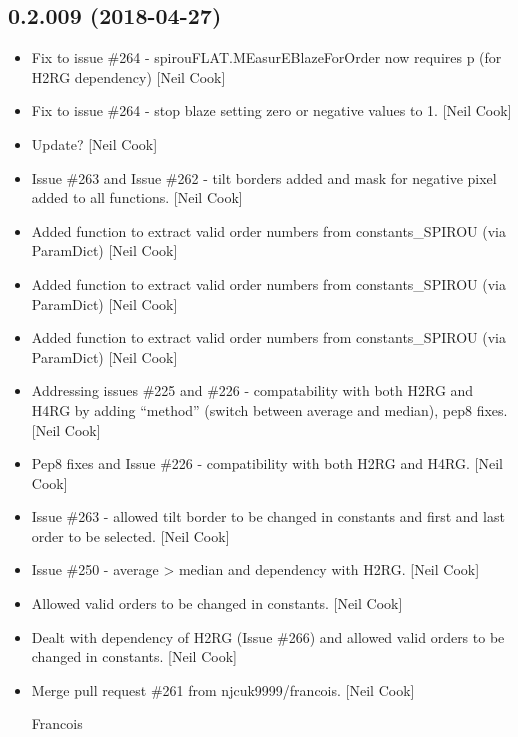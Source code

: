 \documentclass[a4paper,10pt,english]{report}
\begin{document}
\subsection{0.2.009 (2018-04-27)}
\label{\detokenize{misc/changelog:id448}}\begin{itemize}
\item {} 
Fix to issue \#264 - spirouFLAT.MEasurEBlazeForOrder now requires p
(for H2RG dependency) {[}Neil Cook{]}

\item {} 
Fix to issue \#264 - stop blaze setting zero or negative values to 1.
{[}Neil Cook{]}

\item {} 
Update? {[}Neil Cook{]}

\item {} 
Issue \#263 and Issue \#262 - tilt borders added and mask for negative
pixel added to all functions. {[}Neil Cook{]}

\item {} 
Added function to extract valid order numbers from constants\_SPIROU
(via ParamDict) {[}Neil Cook{]}

\item {} 
Added function to extract valid order numbers from constants\_SPIROU
(via ParamDict) {[}Neil Cook{]}

\item {} 
Added function to extract valid order numbers from constants\_SPIROU
(via ParamDict) {[}Neil Cook{]}

\item {} 
Addressing issues \#225 and \#226 - compatability with both H2RG and
H4RG by adding “method” (switch between average and median), pep8
fixes. {[}Neil Cook{]}

\item {} 
Pep8 fixes and Issue \#226 - compatibility with both H2RG and H4RG.
{[}Neil Cook{]}

\item {} 
Issue \#263 - allowed tilt border to be changed in constants and first
and last order to be selected. {[}Neil Cook{]}

\item {} 
Issue \#250 - average \textendash{}\textgreater{} median and dependency with H2RG. {[}Neil Cook{]}

\item {} 
Allowed valid orders to be changed in constants. {[}Neil Cook{]}

\item {} 
Dealt with dependency of H2RG (Issue \#266) and allowed valid orders to
be changed in constants. {[}Neil Cook{]}

\item {} 
Merge pull request \#261 from njcuk9999/francois. {[}Neil Cook{]}

Francois

\end{itemize}
\end{document}
